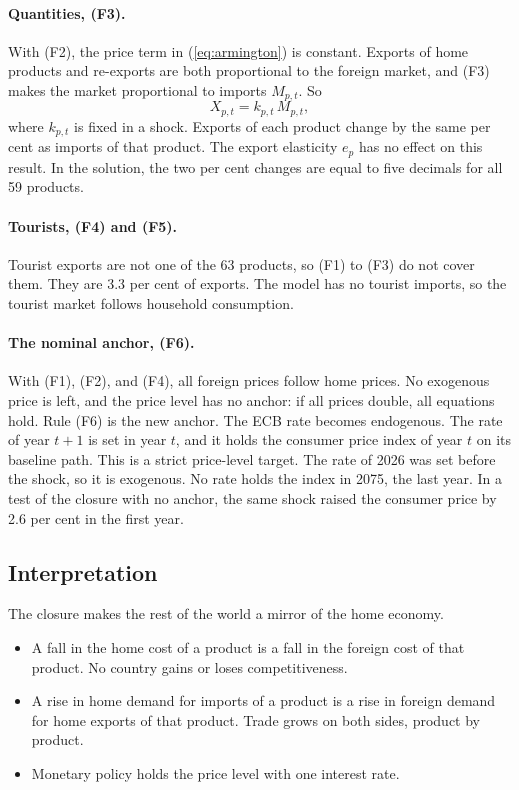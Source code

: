 \documentclass[11pt,a4paper]{article}
\begin{document}
\paragraph{Quantities, (F3).}
With (F2), the price term in (\ref{eq:armington}) is constant. Exports of home products and re-exports are both proportional to the foreign market, and (F3) makes the market proportional to imports $M_{p,t}$. So
\begin{equation}
X_{p,t} = k_{p,t}\, M_{p,t} ,
\label{eq:mirror}
\end{equation}
where $k_{p,t}$ is fixed in a shock. Exports of each product change by the same per cent as imports of that product. The export elasticity $e_p$ has no effect on this result.
In the solution, the two per cent changes are equal to five decimals for all 59 products.

\paragraph{Tourists, (F4) and (F5).}
Tourist exports are not one of the 63 products, so (F1) to (F3) do not cover them. They are 3.3 per cent of exports. The model has no tourist imports, so the tourist market follows household consumption.

\paragraph{The nominal anchor, (F6).}
With (F1), (F2), and (F4), all foreign prices follow home prices. No exogenous price is left, and the price level has no anchor: if all prices double, all equations hold.
Rule (F6) is the new anchor. The ECB rate becomes endogenous. The rate of year $t+1$ is set in year $t$, and it holds the consumer price index of year $t$ on its baseline path. This is a strict price-level target.
The rate of 2026 was set before the shock, so it is exogenous. No rate holds the index in 2075, the last year.
In a test of the closure with no anchor, the same shock raised the consumer price by 2.6 per cent in the first year.

\subsection{Interpretation}

The closure makes the rest of the world a mirror of the home economy.
\begin{itemize}
\item A fall in the home cost of a product is a fall in the foreign cost of that product. No country gains or loses competitiveness.
\item A rise in home demand for imports of a product is a rise in foreign demand for home exports of that product. Trade grows on both sides, product by product.
\item Monetary policy holds the price level with one interest rate.
\end{itemize}
\end{document}
